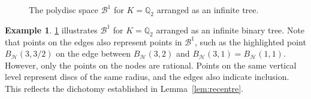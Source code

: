 \documentclass[10pt]{article}
\theoremstyle{definition}
\newtheorem{example}[theorem]{Example}
\newcommand{\QQ}{\mathbb{Q}}
\begin{document}
\begin{figure}
\vspace{-2mm}
  \caption{The polydisc space $\mathcal B^1$ for $K=\QQ_2$ arranged as an infinite tree.}
  \label{fig:polydiscSpace}
\end{figure}

\begin{example}\label{ex:polydiscSpace}
  \cref{fig:polydiscSpace} illustrates $\mathcal B^1$ for $K=\QQ_2$ arranged as an infinite binary tree.  Note that points on the edges also represent points in $\mathcal B^1$, such as the highlighted point $B_{\mathcal{H}}(3,3/2)$ on the edge between $B_{\mathcal{H}}(3,2)$ and $B_{\mathcal{H}}(3,1)=B_{\mathcal{H}}(1,1)$. However, only the points on the nodes are rational.  Points on the same vertical level represent discs of the same radius, and the edges also indicate inclusion. This reflects the dichotomy established in Lemma~\ref{lem:recentre}.  %
\end{example}
\end{document}

